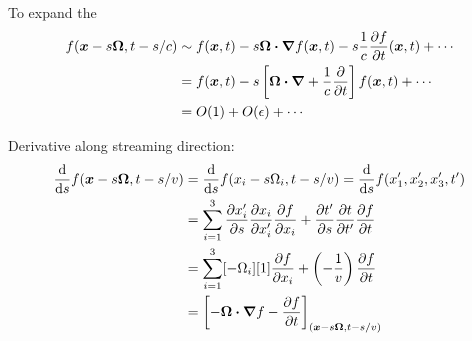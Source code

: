 To expand the 
\begin{align*}
  f(\bm{x} - s \bm{\Omega}, t-s/c)
  &\sim
  f(\bm{x}, t) - s \bm{\Omega} \bm{\cdot} \bm{\nabla} f(\bm{x}, t)
  - s\frac{1}{c} \frac{\partial f}{\partial t}(\bm{x}, t) + \cdots
  \\
  &= f(\bm{x}, t) - s \left[ \bm{\Omega} \bm{\cdot} \bm{\nabla}
  + \frac{1}{c} \frac{\partial }{\partial t} \right] f(\bm{x}, t) + \cdots
  \\
  &= O(1) +
  O(\epsilon) + \cdots
\end{align*}

Derivative along streaming direction:
\begin{align*}
  \frac{\mathrm{d} }{\mathrm{d} s} f(\bm{x} - s \bm{\Omega}, t-s/v)
  &=  \frac{\mathrm{d} }{\mathrm{d} s} f(x_i - s \Omega_i, t-s/v)
  = \frac{\mathrm{d} }{\mathrm{d} s} f(x_1',x_2',x_3',t')
  \\
  &= \sum_{i=1}^{3}
  \frac{\partial x_i'}{\partial s}\frac{\partial x_i}{\partial x_i'} \frac{\partial f}{\partial x_i}
  + \frac{\partial t'}{\partial s}\frac{\partial t}{\partial t'} \frac{\partial f}{\partial t}
  \\
  &= \sum_{i=1}^{3} [- \Omega_i][1]\frac{\partial f}{\partial x_i} 
  + \left( -\frac{1}{v} \right)  \frac{\partial f}{\partial t}
  \\
  &= \left[ -\bm{\Omega} \bm{\cdot} \bm{\nabla} f - \frac{\partial f}{\partial t} \right]_{(\bm{x} - s
  \bm{\Omega}, t-s/v)}
\end{align*}


